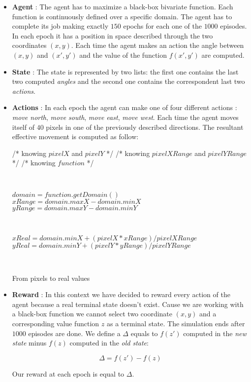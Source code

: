 \begin{itemize}
	\item \textbf{Agent} : The agent has to maximize a black-box bivariate function. Each function is continuously defined over a specific domain. The agent has to complete its job making exactly $150$ epochs for each one of the $1000$ episodes. In each epoch it has a position in space described through the two coordinates $(x, y)$. Each time the agent makes an action the angle between $(x, y)$ and $(x', y')$ and the value of the function $f(x', y')$ are computed.
	\item \textbf{State} : The state is represented by two lists: the first one contains the last two computed \textit{angles} and the second one contains the correspondent last two \textit{actions}.
	\item \textbf{Actions} : In each epoch the agent can make one of four different actions : \textit{move north}, \textit{move  south}, \textit{move east}, \textit{move west}. Each time the agent moves itself of $40$ pixels in one of the previously described directions. The resultant effective movement is computed as follow:
	
	\begin{algorithm} [h!]
		/* knowing $pixelX$ and $pixelY$ */\;
		/* knowing $pixelXRange$ and $pixelYRange$ */ \;
		/* knowing $function$ */\;
		
		\
		
		$domain = function.getDomain()$ \;
		$xRange = domain.maxX - domain.minX$ \;
		$yRange = domain.maxY - domain.minY$ \;
		
		\
		
		$xReal = domain.minX + (pixelX * xRange) / pixelXRange$ \;
		$yReal = domain.minY + (pixelY * yRange) / pixelYRange$ \;
		
		\
		
		\caption{From pixels to real values} 
	\end{algorithm}
	
	\item \textbf{Reward} : In this context we have decided to reward every action of the agent because a real terminal state doesn't exist. Cause we are working with a black-box function we cannot select two coordinate $(x, y)$ and a corresponding value function $z$ as a terminal state. The simulation ends after $1000$ episodes are done. We define a $\Delta$ equals to $f(z')$ computed in the \textit{new state} minus $f(z)$ computed in the \textit{old state}:
	
	\begin{equation}
		\Delta = f(z') - f(z)
	\end{equation} 
	
	Our reward at each epoch is equal to $\Delta$.
\end{itemize}

